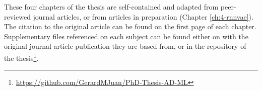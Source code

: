 These four chapters of the thesis are self-contained and adapted from peer-reviewed journal articles, or from articles in preparation (Chapter \ref{ch:4-rnnvae}). The citation to the original article can be found on the first page of each chapter. Supplementary files referenced on each subject can be found either on with the original journal article publication they are based from, or in the repository of the thesis\footnote{\url{https://github.com/GerardMJuan/PhD-Thesis-AD-ML}}.






